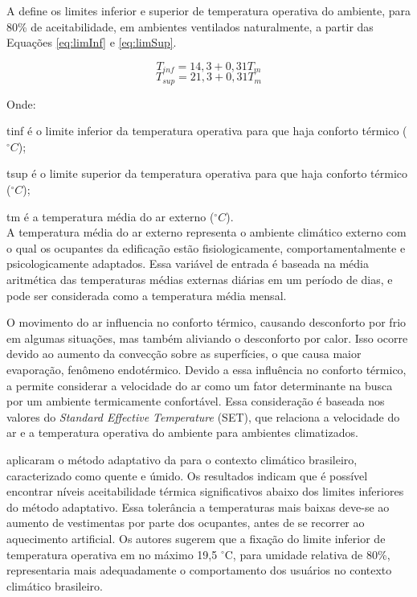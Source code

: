 \documentclass[brazil,hardcopy,openany]{ufscthesis} %
\begin{document}
A  define os limites inferior e superior de temperatura operativa do ambiente, para 80\% de aceitabilidade, em ambientes ventilados naturalmente, a partir das Equações \ref{eq:limInf} e \ref{eq:limSup}.

\begin{equation}\label{eq:limInf}
T_{inf} = 14,3 + 0,31 T_m
\end{equation}
\begin{equation}\label{eq:limSup}
T_{sup} = 21,3 + 0,31 T_m
\end{equation}

Onde:

\gls{tinf} é o limite inferior da temperatura operativa para que haja conforto térmico ($^{\circ}C$);

\gls{tsup} é o limite superior da temperatura operativa para que haja conforto térmico ($^{\circ}C$);

\gls{tm} é a temperatura média do ar externo ($^{\circ}C$).
\\

A temperatura média do ar externo representa o ambiente climático externo com o qual os ocupantes da edificação estão fisiologicamente,
comportamentalmente e psicologicamente adaptados. Essa variável de entrada é baseada na média aritmética das temperaturas médias externas diárias em um período de dias, e pode ser considerada como a temperatura média mensal.

O movimento do ar influencia no conforto térmico, causando desconforto por frio em algumas situações, mas também aliviando o desconforto por calor.
Isso ocorre devido ao aumento da convecção sobre as superfícies, o que causa maior evaporação, fenômeno endotérmico. Devido a essa influência no conforto térmico, a  permite considerar a velocidade do ar como um fator determinante na busca por um ambiente termicamente confortável. Essa consideração é baseada nos valores do  \textit{Standard Effective Temperature} (SET), que relaciona a velocidade do ar e a temperatura operativa do ambiente para ambientes climatizados.

 aplicaram o método adaptativo da  para o contexto climático brasileiro, caracterizado como quente e úmido. Os resultados indicam que é possível encontrar níveis aceitabilidade térmica significativos abaixo dos limites inferiores do método adaptativo. Essa tolerância a temperaturas mais baixas deve-se ao aumento de vestimentas por parte dos ocupantes, antes de se recorrer ao aquecimento artificial. Os autores sugerem que a fixação do limite inferior de temperatura operativa em no máximo 19,5 $^{\circ}$C, para umidade relativa de 80\%, representaria mais adequadamente o comportamento dos usuários no contexto climático brasileiro.
\end{document}
